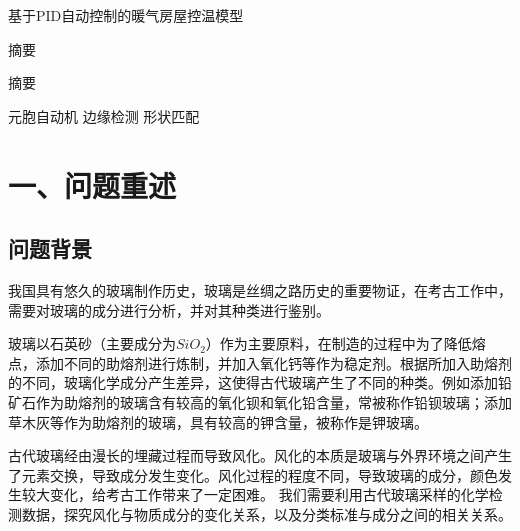 \documentclass{my_paper}
\newcommand{\lunwenbiaoti}{\fontsize{15.75pt}{0}\heiti 基于PID自动控制的暖气房屋控温模型}
\newcommand{\zhaiyao}{\fontsize{14pt}{0}\heiti 摘要}
\begin{document}
\newpage
\begin{center}
\lunwenbiaoti

\vspace{2ex}
\zhaiyao
\end{center}

摘要

\begin{guanjianci}
 元胞自动机 \quad 边缘检测 \quad 形状匹配
\end{guanjianci}

\newpage
\section{一、问题重述}

\subsection{问题背景}

我国具有悠久的玻璃制作历史，玻璃是丝绸之路历史的重要物证，在考古工作中，需要对玻璃的成分进行分析，并对其种类进行鉴别。

玻璃以石英砂（主要成分为$SiO_2$）作为主要原料，在制造的过程中为了降低熔点，添加不同的助熔剂进行炼制，并加入氧化钙等作为稳定剂。根据所加入助熔剂的不同，玻璃化学成分产生差异，这使得古代玻璃产生了不同的种类。例如添加铅矿石作为助熔剂的玻璃含有较高的氧化钡和氧化铅含量，常被称作铅钡玻璃；添加草木灰等作为助熔剂的玻璃，具有较高的钾含量，被称作是钾玻璃。

古代玻璃经由漫长的埋藏过程而导致风化。风化的本质是玻璃与外界环境之间产生了元素交换，导致成分发生变化。风化过程的程度不同，导致玻璃的成分，颜色发生较大变化，给考古工作带来了一定困难。
我们需要利用古代玻璃采样的化学检测数据，探究风化与物质成分的变化关系，以及分类标准与成分之间的相关关系。
\end{document}
